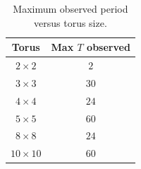 \begin{table}[h]
\centering
\caption{Maximum observed period versus torus size.}
\label{tab:max-period-disc}
\begin{tabular}{cc}
\toprule
Torus & Max $T$ observed \\
\midrule
$2\times2$ & $2$ \\
$3\times3$ & $30$ \\
$4\times4$ & $24$ \\
$5\times5$ & $60$ \\
$8\times8$ & $24$ \\
$10\times10$ & $60$ \\
\bottomrule
\end{tabular}
\end{table}
